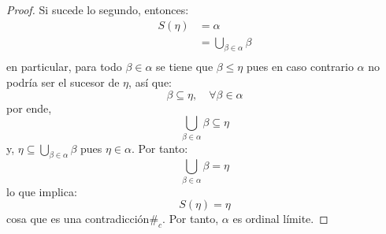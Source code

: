 \documentclass[12pt]{report}
\newcounter{it}
\theoremstyle{largebreak}
\newcommand\contradiction{\ensuremath{\#_c}}
\begin{document}
\begin{proof}
        Si sucede lo segundo, entonces:
        \begin{equation*}
            \begin{split}
                S(\eta)&=\alpha\\
                &=\bigcup_{\beta\in\alpha}\beta\\
            \end{split}
        \end{equation*}
        en particular, para todo $\beta\in\alpha$ se tiene que $\beta\leq\eta$ pues en caso contrario $\alpha$ no podría ser el sucesor de $\eta$, así que:
        \begin{equation*}
            \beta\subseteq\eta,\quad\forall\beta\in\alpha
        \end{equation*}
        por ende,
        \begin{equation*}
            \bigcup_{\beta\in\alpha}\beta\subseteq\eta
        \end{equation*}
        y, $\eta\subseteq\bigcup_{\beta\in\alpha}\beta$ pues $\eta\in\alpha$. Por tanto:
        \begin{equation*}
            \bigcup_{\beta\in\alpha}\beta=\eta
        \end{equation*}
        lo que implica:
        \begin{equation*}
            S(\eta)=\eta
        \end{equation*}
        cosa que es una contradicción\contradiction. Por tanto, $\alpha$ es ordinal límite.
    \end{proof}

    \begin{excer}[Nombre]
        
    \end{excer}
\end{document}
